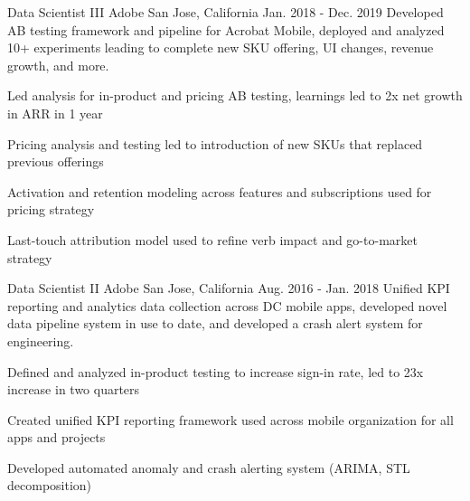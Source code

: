\begin{cventries}
\cventry
    {Data Scientist III} %
    {Adobe} %
    {San Jose, California} %
    {Jan. 2018 - Dec. 2019} %
    {Developed AB testing framework and pipeline for Acrobat Mobile, deployed and analyzed 10+ experiments leading to complete new SKU offering, UI changes, revenue growth, and more.} %
    {
      \begin{cvitems} %
        \item {Led analysis for in-product and pricing AB testing, learnings led to 2x net growth in ARR in 1 year}
        \item {Pricing analysis and testing led to introduction of new SKUs that replaced previous offerings}
        \item {Activation and retention modeling across features and subscriptions used for pricing strategy}
        \item {Last-touch attribution model used to refine verb impact and go-to-market strategy}
      \end{cvitems}
    }

\cventry
    {Data Scientist II} %
    {Adobe} %
    {San Jose, California} %
    {Aug. 2016 - Jan. 2018} %
    {Unified KPI reporting and analytics data collection across DC mobile apps, developed novel data pipeline system in use to date, and developed a crash alert system for engineering.} %
    {
      \begin{cvitems} %
        \item {Defined and analyzed in-product testing to increase sign-in rate, led to 23x increase in two quarters}
        \item {Created unified KPI reporting framework used across mobile organization for all apps and projects}
        \item {Developed automated anomaly and crash alerting system (ARIMA, STL decomposition)}
      \end{cvitems}
    }

\end{cventries}
